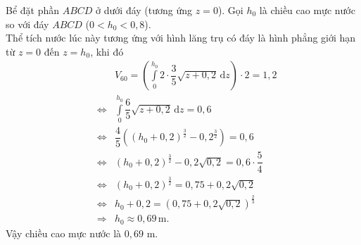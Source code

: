 \begin{ex}
{\begin{itemchoice}
			Bể đặt phần $ABCD$ ở dưới đáy (tương ứng $z=0$). Gọi $h_0$ là chiều cao mực nước so với đáy $ABCD$ ($0<h_0<0{,}8$). \\
			Thể tích nước lúc này tương ứng với hình lăng trụ có đáy là hình phẳng giới hạn từ $z=0$ đến $z=h_0$, khi đó
			\allowdisplaybreaks
			\begin{eqnarray*}
				&&V_{60} = \left( \displaystyle\int\limits_{0}^{h_0} 2 \cdot \dfrac{3}{5}\sqrt{z+0{,}2} \mathrm{\,d}z \right) \cdot 2 = 1{,}2\\
				&\Leftrightarrow&\displaystyle\int\limits_{0}^{h_0} \dfrac{6}{5}\sqrt{z+0{,}2} \mathrm{\,d}z = 0{,}6 \\
				&\Leftrightarrow & \dfrac{4}{5} \left( (h_0+0{,}2)^{\tfrac{3}{2}} - 0{,}2^{\tfrac{3}{2}} \right) = 0{,}6 \\
				&\Leftrightarrow & (h_0+0{,}2)^{\tfrac{3}{2}} - 0{,}2\sqrt{0{,}2} = 0{,}6 \cdot \dfrac{5}{4} \\
				&\Leftrightarrow & (h_0+0{,}2)^{\tfrac{3}{2}} = 0{,}75 + 0{,}2\sqrt{0{,}2}\\
				&\Leftrightarrow & h_0+0{,}2 = \left( 0{,}75 + 0{,}2\sqrt{0{,}2} \right)^{\tfrac{2}{3}}\\
				&\Rightarrow & h_0 \approx 0{,}69 \mathrm{\,m}.
			\end{eqnarray*}
			Vậy chiều cao mực nước là $0{,}69$ m.
		\end{itemchoice}
	}
\end{ex}

